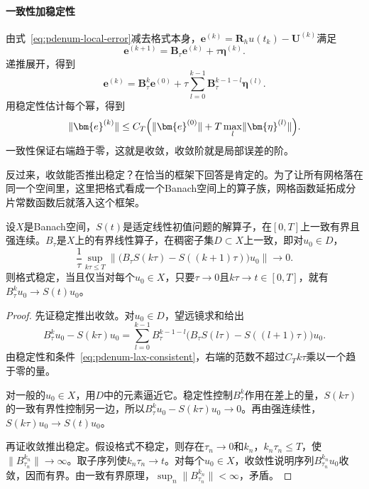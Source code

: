 \paragraph{一致性加稳定性}
由式~\eqref{eq:pdenum-local-error}减去格式本身，$\bm{e}^{(k)}=\bm{R}_hu(t_k)-\bm{U}^{(k)}$满足
\[
 \bm{e}^{(k+1)}=\bm{B}_\tau\bm{e}^{(k)}+\tau\bm{\eta}^{(k)} .
\]
递推展开，得到
\begin{equation}
 \bm{e}^{(k)}=\bm{B}_\tau^k\bm{e}^{(0)}+\tau\sum_{l=0}^{k-1}\bm{B}_\tau^{k-1-l}\bm{\eta}^{(l)} .
 \label{eq:pdenum-error-duhamel}
\end{equation}
用稳定性估计每个幂，得到
\begin{equation}
 \lVert\bm{e}^{(k)}\rVert\leq C_T\Bigl(\lVert\bm{e}^{(0)}\rVert+T\max_l\lVert\bm{\eta}^{(l)}\rVert\Bigr).
 \label{eq:pdenum-lax-bound}
\end{equation}
一致性保证右端趋于零，这就是收敛，收敛阶就是局部误差的阶。

反过来，收敛能否推出稳定？在恰当的框架下回答是肯定的。为了让所有网格落在同一个空间里，这里把格式看成一个Banach空间上的算子族，网格函数延拓成分片常数函数后就落入这个框架。

\begin{theorem}[Lax等价定理]
 \label{thm:pdenum-lax}
 设$X$是Banach空间，$S(t)$是适定线性初值问题的解算子，在$[0,T]$上一致有界且强连续。$B_\tau$是$X$上的有界线性算子，在稠密子集$D\subset X$上一致，即对$u_0\in D$，
 \begin{equation}
  \frac{1}{\tau}\sup_{k\tau\leq T}\bigl\lVert\bigl(B_\tau S(k\tau)-S((k+1)\tau)\bigr)u_0\bigr\rVert\to0 .
  \label{eq:pdenum-lax-consistent}
 \end{equation}
 则格式稳定，当且仅当对每个$u_0\in X$，只要$\tau\to0$且$k\tau\to t\in[0,T]$，就有$B_\tau^ku_0\to S(t)u_0$。
\end{theorem}

\begin{proof}
 先证稳定推出收敛。对$u_0\in D$，望远镜求和给出
 \[
  B_\tau^ku_0-S(k\tau)u_0=\sum_{l=0}^{k-1}B_\tau^{k-1-l}\bigl(B_\tau S(l\tau)-S((l+1)\tau)\bigr)u_0 .
 \]
 由稳定性和条件~\eqref{eq:pdenum-lax-consistent}，右端的范数不超过$C_Tk\tau$乘以一个趋于零的量。

 对一般的$u_0\in X$，用$D$中的元素逼近它。稳定性控制$B_\tau^k$作用在差上的量，$S(k\tau)$的一致有界性控制另一边，所以$B_\tau^ku_0-S(k\tau)u_0\to0$。再由强连续性，$S(k\tau)u_0\to S(t)u_0$。

 再证收敛推出稳定。假设格式不稳定，则存在$\tau_n\to0$和$k_n$，$k_n\tau_n\leq T$，使$\lVert B_{\tau_n}^{k_n}\rVert\to\infty$。取子序列使$k_n\tau_n\to t$。对每个$u_0\in X$，收敛性说明序列$B_{\tau_n}^{k_n}u_0$收敛，因而有界。由一致有界原理，$\sup_n\lVert B_{\tau_n}^{k_n}\rVert<\infty$，矛盾。
\end{proof}

